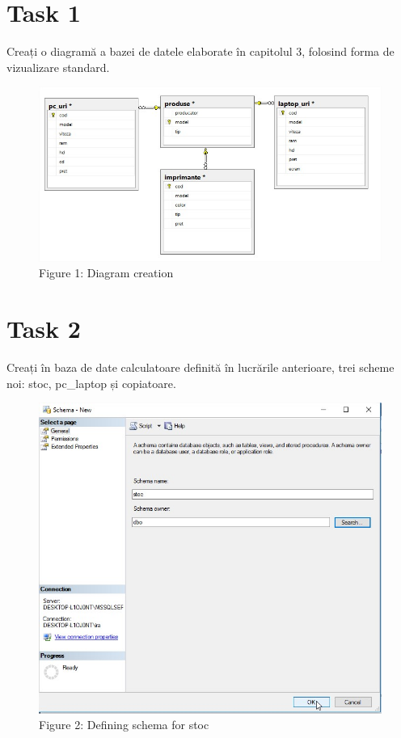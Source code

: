 \section{Task 1}
Creați o diagramă a bazei de datele elaborate în capitolul 3, folosind forma de vizualizare standard.

\begin{figure}[H]
	\centering
		\includegraphics[width=\linewidth]{screens/1.jpg}
		\caption*{Figure 1: Diagram creation}
		\label{}
	\endminipage\hfill
\end{figure}

\section{Task 2}
Creați în baza de date calculatoare definită în lucrările anterioare, trei scheme noi: stoc, pc\_laptop și copiatoare.

\begin{figure}[H]
	\centering
	\includegraphics[scale=0.4]{screens/3.jpg}
	\caption*{Figure 2: Defining schema for stoc}
	\label{}
\end{figure}

